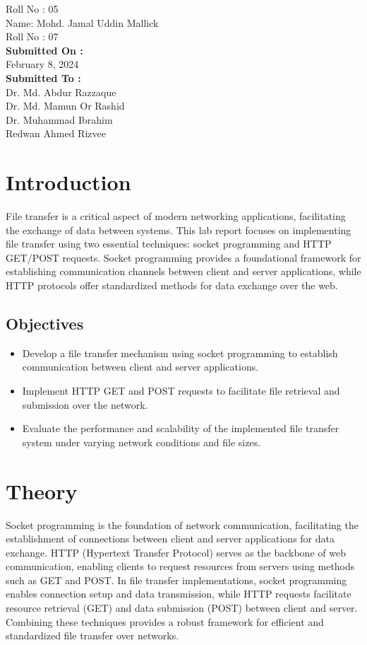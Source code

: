 \documentclass[11pt]{article}
\begin{document}
\begin{titlepage}
\begin{center}
\begin{large}
            Roll No : 05\\[12pt]
            Name: Mohd. Jamal Uddin Mallick\\[8pt]
            Roll No : 07\\[12pt]
            \textbf{Submitted On : \\[12pt]}
            February 8, 2024\\[20pt]
            \textbf{Submitted To :\\[12pt]}
            Dr. Md. Abdur Razzaque\\[12pt]
            Dr. Md. Mamun Or Rashid\\[12pt]
            Dr. Muhammad Ibrahim\\[12pt]
            Redwan Ahmed Rizvee
        \end{large}
\end{center}
\end{titlepage}

\section{Introduction}
File transfer is a critical aspect of modern networking applications, facilitating the exchange of data between systems. This lab report focuses on implementing file transfer using two essential techniques: socket programming and HTTP GET/POST requests. Socket programming provides a foundational framework for establishing communication channels between client and server applications, while HTTP protocols offer standardized methods for data exchange over the web.

\subsection{Objectives}
\begin{itemize}
    \item Develop a file transfer mechanism using socket programming to establish communication between client and server applications.
    \item Implement HTTP GET and POST requests to facilitate file retrieval and submission over the network.
    \item Evaluate the performance and scalability of the implemented file transfer system under varying network conditions and file sizes.
\end{itemize}
\section{Theory}
Socket programming is the foundation of network communication, facilitating the establishment of connections between client and server applications for data exchange. HTTP (Hypertext Transfer Protocol) serves as the backbone of web communication, enabling clients to request resources from servers using methods such as GET and POST. In file transfer implementations, socket programming enables connection setup and data transmission, while HTTP requests facilitate resource retrieval (GET) and data submission (POST) between client and server. Combining these techniques provides a robust framework for efficient and standardized file transfer over networks.
\end{document}
